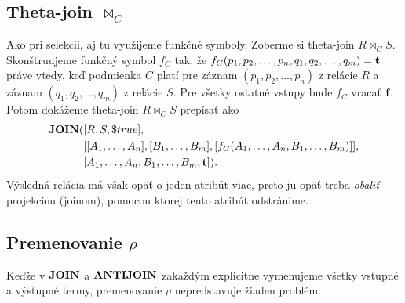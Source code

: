 \subsection*{Theta-join $\Join_C$}
Ako pri selekcii, aj tu využijeme funkčné symboly. Zoberme si theta-join $R \Join_C S$.
Skonštruujeme funkčný symbol $f_C$ tak, že $f_C(p_1, p_2, \dots, p_n, q_1, q_2, \dots, q_m) = \textbf{t}\space$
práve vtedy, keď podmienka $C$ platí pre záznam $(p_1, p_2, \dots, p_n)$ z relácie $R$ a záznam
$(q_1, q_2, \dots, q_m)$ z relácie $S$. Pre všetky ostatné vstupy bude $f_C$ vracať $\textbf{f}\space$. Potom
dokážeme theta-join $R \Join_C S$ prepísať ako
\begin{align*}
    \textbf{JOIN}(&[R, S, \$true], \\
          &[[A_1, \dots, A_n], [B_1, \dots, B_m], [f_C(A_1, \dots, A_n, B_1, \dots, B_m)]], \\
          &[A_1, \dots, A_n, B_1, \dots, B_m, \textbf{t}\space])\text{.}
\end{align*}
Výsledná relácia má však opäť o jeden atribút viac, preto ju opäť treba \textit{obaliť} projekciou
(joinom), pomocou ktorej tento atribút odstránime.

\subsection*{Premenovanie $\rho$}
Keďže v $\textbf{JOIN}$ a $\textbf{ANTIJOIN}$ zakaždým explicitne vymenujeme všetky vstupné a výstupné termy,
premenovanie $\rho$ nepredstavuje žiaden problém.
